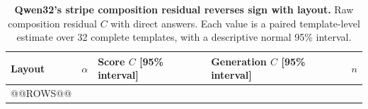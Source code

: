 \begin{table}[t]
\centering\footnotesize
\setlength{\tabcolsep}{7pt}
\caption{\textbf{Qwen32's stripe composition residual reverses sign with layout.} Raw composition residual $C$ with direct answers. Each value is a paired template-level estimate over 32 complete templates, with a descriptive normal 95\% interval.}
\begin{tabular}{@{}lcllr@{}}
\toprule
\rowcolor{DSTableHeader}
Layout & $\alpha$ & Score $C$ [95\% interval] & Generation $C$ [95\% interval] & $n$ \\
\midrule
@@ROWS@@
\bottomrule
\end{tabular}
\label{tab:composition}
\end{table}

